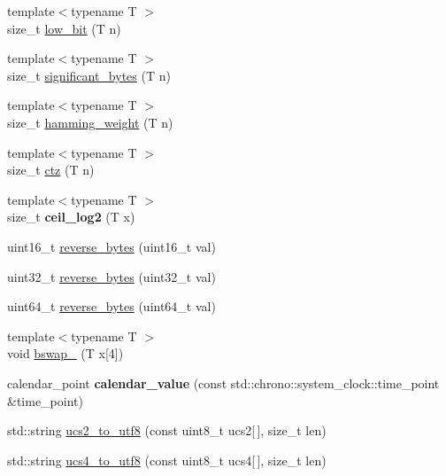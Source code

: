 \begin{DoxyCompactItemize}
\item 
{\footnotesize template$<$typename T $>$ }\\size\+\_\+t \mbox{\hyperlink{namespace_botan_aae0c04508a1e70c5d4ecf363e8b75f00}{low\+\_\+bit}} (T n)
\item 
{\footnotesize template$<$typename T $>$ }\\size\+\_\+t \mbox{\hyperlink{namespace_botan_acec63fb9306fc59d57604c157777361d}{significant\+\_\+bytes}} (T n)
\item 
{\footnotesize template$<$typename T $>$ }\\size\+\_\+t \mbox{\hyperlink{namespace_botan_abb6896c37db627e3ab8e1fa7c72f79fd}{hamming\+\_\+weight}} (T n)
\item 
{\footnotesize template$<$typename T $>$ }\\size\+\_\+t \mbox{\hyperlink{namespace_botan_a4045abfe1da803ec251fcfd4d04b0c10}{ctz}} (T n)
\item 
\mbox{\label{namespace_botan_a03c49c7bd13d7c6648a543775d4a1354}} 
{\footnotesize template$<$typename T $>$ }\\size\+\_\+t {\bfseries ceil\+\_\+log2} (T x)
\item 
uint16\+\_\+t \mbox{\hyperlink{namespace_botan_a124bfd8e6621e1ad0d19d902ce10f149}{reverse\+\_\+bytes}} (uint16\+\_\+t val)
\item 
uint32\+\_\+t \mbox{\hyperlink{namespace_botan_a5c0e57eb245139c321b18d1d242c9e9f}{reverse\+\_\+bytes}} (uint32\+\_\+t val)
\item 
uint64\+\_\+t \mbox{\hyperlink{namespace_botan_ae04de07006f5cfa825328813ea7d3985}{reverse\+\_\+bytes}} (uint64\+\_\+t val)
\item 
{\footnotesize template$<$typename T $>$ }\\void \mbox{\hyperlink{namespace_botan_a5ec087b9959d7ffcbc195dcedbf10513}{bswap\+\_}} (T x\mbox{[}4\mbox{]})
\item 
\mbox{\label{namespace_botan_afed98df0cf6f5b39eee2e12ddfefcde5}} 
calendar\+\_\+point {\bfseries calendar\+\_\+value} (const std\+::chrono\+::system\+\_\+clock\+::time\+\_\+point \&time\+\_\+point)
\item 
std\+::string \mbox{\hyperlink{namespace_botan_a2d7ee67f502279fc24a01b42c5451c3c}{ucs2\+\_\+to\+\_\+utf8}} (const uint8\+\_\+t ucs2\mbox{[}$\,$\mbox{]}, size\+\_\+t len)
\item 
std\+::string \mbox{\hyperlink{namespace_botan_a2bb4359def9a750e534e6ece252bd319}{ucs4\+\_\+to\+\_\+utf8}} (const uint8\+\_\+t ucs4\mbox{[}$\,$\mbox{]}, size\+\_\+t len)

\end{DoxyCompactItemize}
